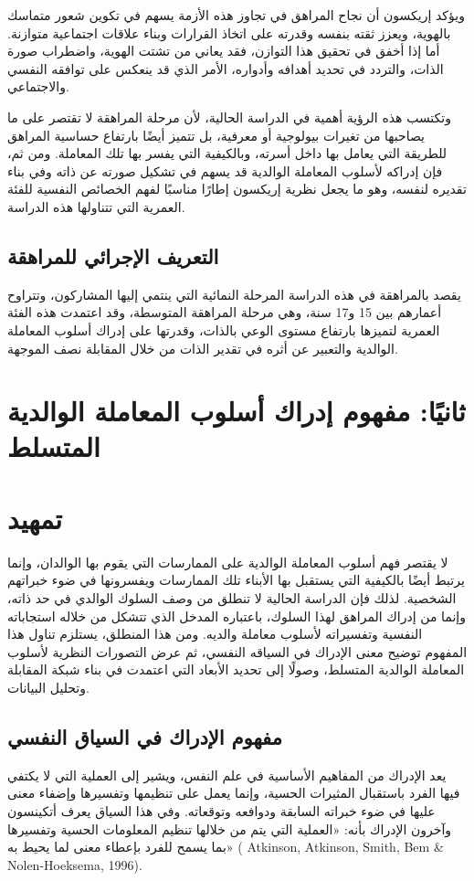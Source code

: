 \documentclass[12pt,oneside]{report}
\begin{document}
ويؤكد إريكسون أن نجاح المراهق في تجاوز هذه الأزمة يسهم في تكوين شعور متماسك بالهوية، ويعزز ثقته بنفسه وقدرته على اتخاذ القرارات وبناء علاقات اجتماعية متوازنة. أما إذا أخفق في تحقيق هذا التوازن، فقد يعاني من تشتت الهوية، واضطراب صورة الذات، والتردد في تحديد أهدافه وأدواره، الأمر الذي قد ينعكس على توافقه النفسي والاجتماعي.

وتكتسب هذه الرؤية أهمية في الدراسة الحالية، لأن مرحلة المراهقة لا تقتصر على ما يصاحبها من تغيرات بيولوجية أو معرفية، بل تتميز أيضًا بارتفاع حساسية المراهق للطريقة التي يعامل بها داخل أسرته، وبالكيفية التي يفسر بها تلك المعاملة. ومن ثم، فإن إدراكه لأسلوب المعاملة الوالدية قد يسهم في تشكيل صورته عن ذاته وفي بناء تقديره لنفسه، وهو ما يجعل نظرية إريكسون إطارًا مناسبًا لفهم الخصائص النفسية للفئة العمرية التي تتناولها هذه الدراسة.

\subsection{التعريف الإجرائي للمراهقة}
يقصد بالمراهقة في هذه الدراسة المرحلة النمائية التي ينتمي إليها المشاركون، وتتراوح أعمارهم بين 15 و17 سنة، وهي مرحلة المراهقة المتوسطة، وقد اعتمدت هذه الفئة العمرية لتميزها بارتفاع مستوى الوعي بالذات، وقدرتها على إدراك أسلوب المعاملة الوالدية والتعبير عن أثره في تقدير الذات من خلال المقابلة نصف الموجهة.

\section{ثانيًا: مفهوم إدراك أسلوب المعاملة الوالدية المتسلط}
\section*{تمهيد}
لا يقتصر فهم أسلوب المعاملة الوالدية على الممارسات التي يقوم بها الوالدان، وإنما يرتبط أيضًا بالكيفية التي يستقبل بها الأبناء تلك الممارسات ويفسرونها في ضوء خبراتهم الشخصية. لذلك فإن الدراسة الحالية لا تنطلق من وصف السلوك الوالدي في حد ذاته، وإنما من إدراك المراهق لهذا السلوك، باعتباره المدخل الذي تتشكل من خلاله استجاباته النفسية وتفسيراته لأسلوب معاملة والديه. ومن هذا المنطلق، يستلزم تناول هذا المفهوم توضيح معنى الإدراك في السياقه النفسي، ثم عرض التصورات النظرية لأسلوب المعاملة الوالدية المتسلط، وصولًا إلى تحديد الأبعاد التي اعتمدت في بناء شبكة المقابلة وتحليل البيانات.

\subsection{مفهوم الإدراك في السياق النفسي}
يعد الإدراك من المفاهيم الأساسية في علم النفس، ويشير إلى العملية التي لا يكتفي فيها الفرد باستقبال المثيرات الحسية، وإنما يعمل على تنظيمها وتفسيرها وإضفاء معنى عليها في ضوء خبراته السابقة ودوافعه وتوقعاته. وفي هذا السياق يعرف أتكينسون وآخرون الإدراك بأنه:  «العملية التي يتم من خلالها تنظيم المعلومات الحسية وتفسيرها بما يسمح للفرد بإعطاء معنى لما يحيط به» ( Atkinson,  Atkinson, Smith, Bem \& Nolen-Hoeksema, 1996).
\end{document}
